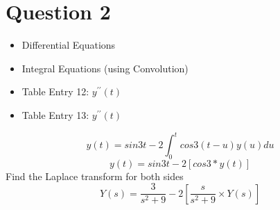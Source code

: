 \documentclass[11pt,a4paper,titlepage,oneside,openany]{article}
\numberwithin{equation}{section}
\numberwithin{algorithm}{section}
\numberwithin{figure}{section}
\numberwithin{table}{section}
\begin{document}
\section*{Question 2}
\begin{itemize}
\item Differential Equations
\item Integral Equations (using Convolution)
\end{itemize}
\begin{itemize}
\item Table Entry 12: $ y^{\prime\prime}(t)$
\item Table Entry 13: $ y^{\prime\prime}(t)$
\end{itemize}

\[ y(t) = sin 3t - 2\int^t_0 cos 3(t-u)y(u)du\]
\[ y(t) = sin 3t - 2\left[cos 3\ast y(t)\right]\]
Find the Laplace transform for both sides
\[ Y(s) = \frac{3}{s^2+9} - 2\left[\frac{s}{s^2+9} \times  Y(s)\right]\]
\end{document}
